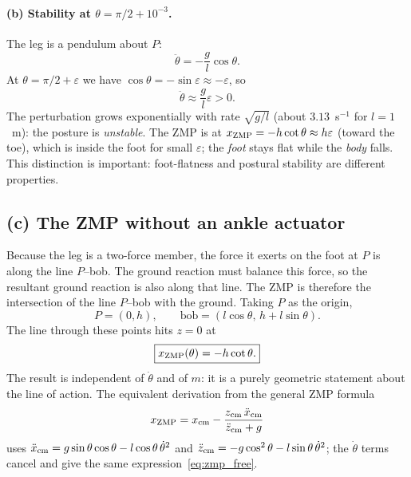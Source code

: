 \documentclass[11pt]{article}
\begin{document}
\paragraph{(b) Stability at $\theta=\pi/2+10^{-3}$.}
The leg is a pendulum about $P$:
\begin{equation}
\ddot{\theta}=-\frac{g}{l}\cos\theta .
\end{equation}
At $\theta=\pi/2+\varepsilon$ we have $\cos\theta=-\sin\varepsilon\approx
-\varepsilon$, so
\begin{equation}
\ddot{\theta}\approx\frac{g}{l}\varepsilon>0 .
\end{equation}
The perturbation grows exponentially with rate $\sqrt{g/l}$ (about
$3.13$~s$^{-1}$ for $l=1$~m): the posture is \emph{unstable}.  The ZMP is at
$x_{\rm ZMP}=-h\cot\theta\approx h\varepsilon$ (toward the toe), which is
inside the foot for small $\varepsilon$; the \emph{foot} stays flat while the
\emph{body} falls.  This distinction is important: foot-flatness and postural
stability are different properties.

\subsection{(c) The ZMP without an ankle actuator}

Because the leg is a two-force member, the force it exerts on the foot at $P$
is along the line $P$--bob.  The ground reaction must balance this force, so
the resultant ground reaction is also along that line.  The ZMP is therefore
the intersection of the line $P$--bob with the ground.  Taking $P$ as the
origin,
\[
P=(0,h),\qquad \text{bob}=(l\cos\theta,\,h+l\sin\theta).
\]
The line through these points hits $z=0$ at
\begin{equation}
\boxed{x_{\rm ZMP}(\theta)=-h\cot\theta .}
\label{eq:zmp_free}
\end{equation}
The result is independent of $\dot\theta$ and of $m$: it is a purely geometric
statement about the line of action.  The equivalent derivation from the general
ZMP formula
\[
x_{\rm ZMP}=x_{\rm cm}-\frac{z_{\rm cm}\,\ddot{x}_{\rm cm}}
{\ddot{z}_{\rm cm}+g}
\]
uses $\ddot{x}_{\rm cm}=g\sin\theta\cos\theta-l\cos\theta\,\dot\theta^2$ and
$\ddot{z}_{\rm cm}=-g\cos^2\theta-l\sin\theta\,\dot\theta^2$; the
$\dot\theta$ terms cancel and give the same
expression~\eqref{eq:zmp_free}.
\end{document}
